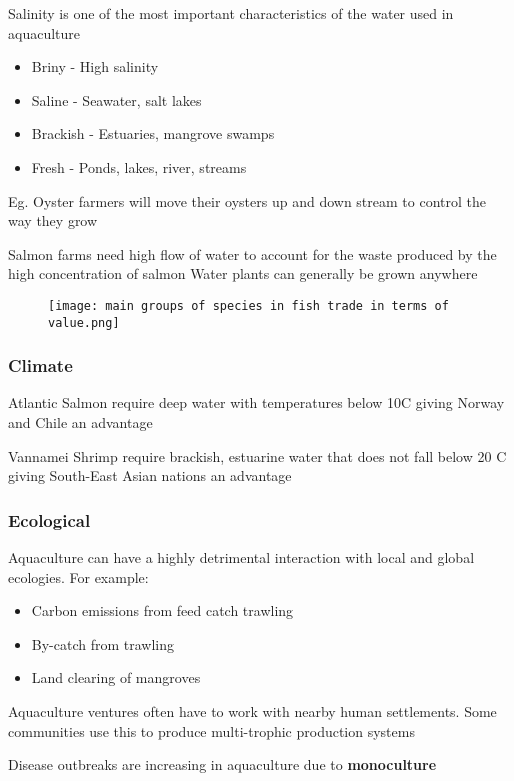 			Salinity is one of the most important characteristics of the water used in aquaculture
			\begin{itemize}
				\item Briny - High salinity
				\item Saline - Seawater, salt lakes
				\item Brackish - Estuaries, mangrove swamps
				\item Fresh - Ponds, lakes, river, streams
			\end{itemize}
		
			Eg. Oyster farmers will move their oysters up and down stream to control the way they grow

			Salmon farms need high flow of water to account for the waste produced by the high concentration of salmon
			Water plants can generally be grown anywhere

			\begin{figure}[H]
				\centering
				\texttt{[image: main groups of species in fish trade in terms of value.png]}
			\end{figure}
			
		\subsubsection{Climate}
			Atlantic Salmon require deep water with temperatures below 10\textdegree C giving Norway and Chile an advantage

			Vannamei Shrimp require brackish, estuarine water that does not fall below 20 \textdegree C giving South-East Asian nations an advantage

		\subsubsection{Ecological}
			Aquaculture can have a highly detrimental interaction with local and global ecologies. For example:
			\begin{itemize}
				\item Carbon emissions from feed catch trawling
				\item By-catch from trawling
				\item Land clearing of mangroves
			\end{itemize}

			Aquaculture ventures often have to work with nearby human settlements. Some communities use this to produce multi-trophic production systems

			Disease outbreaks are increasing in aquaculture due to \textbf{monoculture}

